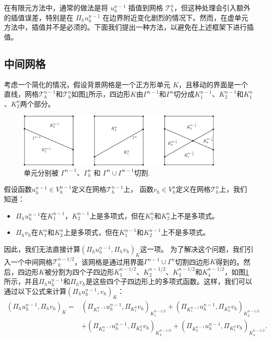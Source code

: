 在有限元方法中，通常的做法是将 $u_h^{n-1}$ 插值到网格
$\mathcal{T}_h^n$，但这种处理会引入额外的插值误差，特别是在 $\Pi_h u_h^{n-1}$
在边界附近变化剧烈的情况下。然而，在虚单元方法中，插值并不是必须的。下面我们提出一种方法，以避免在上述框架下进行插值。

\subsection{中间网格}
考虑一个简化的情况，假设背景网格是一个正方形单元
$K$，且移动的界面是一个直线，网格$\mathcal{T}_h^{n-1}$和$\mathcal{T}_h^n$如图\ref{fig:overlapmesh}所示，四边形$K$由$\Gamma^{n-1}$和$\Gamma^n$切分成$K_1^{n-1}$、$K_2^{n-1}$和$K_1^n$、$K_2^n$两个部分。

\begin{figure}[h]
    \centering
    \includegraphics[width=4in]{./figures/movingmaxwell/overlap_interface.pdf}
    \caption{单元分别被 $\Gamma^{n-1}$、$\Gamma_h^n$ 和
    $\Gamma^{n}\cup\Gamma^{n-1}$切割.}
     \label{fig:overlapmesh} %
\end{figure}

假设函数$u_h^{n-1}\in V_h^{n-1}$定义在网格$\mathcal{T}_h^{n-1}$上，
函数$v_h\in V_h^{n}$定义在网格$\mathcal{T}_h^n$上，我们知道：
\begin{itemize}
    \item $\Pi_h
        u_h^{n-1}$在$K_1^{n-1}，K_2^{n-1}$上是多项式，但在$K_1^n$和$K_2^n$上不是多项式。
    \item $\Pi_h
        v_h$在$K_1^n$和$K_2^n$上是多项式，但在$K_1^{n-1}$和$K_2^{n-1}$上不是多项式。
\end{itemize}
因此，我们无法直接计算$(\Pi_h u_h^{n-1}, \Pi_h v_h)_K$这一项。
为了解决这个问题，我们引入一个中间网格$\mathcal{T}_h^{n-1/2}$，该网格是通过用界面$\Gamma^{n-1}\cup\Gamma^n$切割四边形$K$得到的。然后，四边形$K$被分割为四个子四边形$K_1^{n-1/2}$、$K_2^{n-1/2}$、$K_3^{n-1/2}$和$K_4^{n-1/2}$，如图\ref{fig:overlapmesh}所示，并且$\Pi_h
u_h^{n-1}$和$\Pi_h
v_h$是这些四个子四边形上的多项式函数。这样，我们可以通过以下公式来计算$(\Pi_h
u_h^{n-1}, v_h)_K$：
$$
\begin{aligned}
    (\Pi_h u_h^{n-1}, \Pi_h v_h)_K =
    &
    (\Pi_{K_1^{n-1}}u_h^{n-1}, \Pi_{K_1^{n}}v_h)_{K_1^{n-1/2}}
    +
    (\Pi_{K_1^{n-1}}u_h^{n-1}, \Pi_{K_2^{n}}v_h)_{K_2^{n-1/2}}\\
    & +
    (\Pi_{K_2^{n-1}}u_h^{n-1}, \Pi_{K_2^{n}}v_h)_{K_3^{n-1/2}}
    +
    (\Pi_{K_2^{n-1}}u_h^{n-1}, \Pi_{K_1^{n}}v_h)_{K_4^{n-1/2}}.
\end{aligned}
$$

